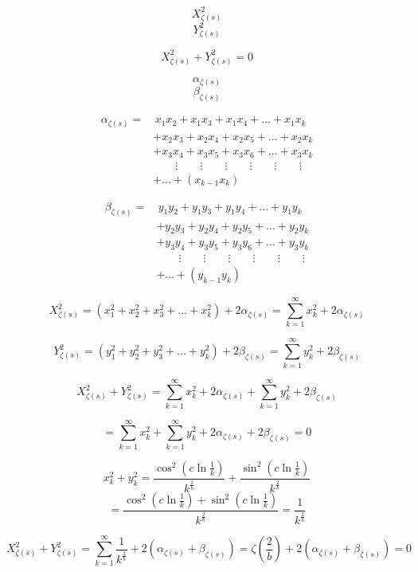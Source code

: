 \documentclass{amsart}
\begin{document}
	
	\[ X_{\zeta(s)}^2 \]
	\[ Y_{\zeta(s)}^2 \]
	
	\[ X_{\zeta(s)}^2 + Y_{\zeta(s)}^2 = 0 \]
	
	\[ \alpha_{\zeta(s)} \]
	\[ \beta_{\zeta(s)} \]
	
	\[
	\begin{aligned}
		\alpha_{\zeta(s)} =& \, x_1x_2 + x_1x_3 + x_1x_4 + \dots + x_{1}x_{k} \\
		& + x_2x_3 + x_2x_4 + x_2x_5 + \dots + x_2x_{k} \\
		& + x_3x_4 + x_3x_5 + x_3x_6 + \dots + x_3x_{k} \\
		& \qquad\vdots \qquad\vdots \qquad\vdots \qquad\vdots \qquad\vdots \qquad\vdots \\
		&  + \dots + (x_{k-1}x_{k})
	\end{aligned}
	\]
	
	\[
	\begin{aligned}
		\beta_{\zeta(s)} =& \, y_1y_2 + y_1y_3 + y_1y_4 + \dots + y_{1}y_{k} \\
		& + y_2y_3 + y_2y_4 + y_2y_5 + \dots + y_2y_{k} \\
		& + y_3y_4 + y_3y_5 + y_3y_6 + \dots + y_3y_{k} \\
		& \qquad\vdots \qquad\vdots \qquad\vdots \qquad\vdots \qquad\vdots \qquad\vdots \\
		&  + \dots + (y_{k-1}y_{k})
	\end{aligned}
	\]
	
	\[ X^2_{\zeta(s)} = (x_1^2 + x_2^2 + x_3^2 + \dots + x_k^2) + 2 \alpha_{\zeta(s)} = \sum\limits_{k=1}^{\infty}x_k^2 + 2 \alpha_{\zeta(s)} \]
	
	\[ Y^2_{\zeta(s)} = (y_1^2 + y_2^2 + y_3^2 + \dots + y_k^2) + 2 \beta_{\zeta(s)} = \sum\limits_{k=1}^{\infty}y_k^2 + 2 \beta_{\zeta(s)} \]
	
	\[ X^2_{\zeta(s)} + Y^2_{\zeta(s)} = \sum\limits_{k=1}^{\infty}x_k^2 + 2\alpha_{\zeta(s)} + \sum\limits_{k=1}^{\infty}y_k^2 + 2\beta_{\zeta(s)} \]
	
	\[ = \sum\limits_{k=1}^{\infty}x_k^2 + \sum\limits_{k=1}^{\infty}y_k^2 + 2\alpha_{\zeta(s)} +  2\beta_{\zeta(s)} = 0 \]
	
	\[ x_k^2 + y_k^2 = \frac{\cos^2(c \ln \frac{1}{k})}{k^{\frac{2}{b}}} + \frac{\sin^2(c \ln \frac{1}{k})}{k^{\frac{2}{b}}} \]
	\[ = \frac{\cos^2(c \ln \frac{1}{k}) + \sin^2(c \ln \frac{1}{k})}{k^{\frac{2}{b}}} = \frac{1}{k^{\frac{2}{b}}} \]
	
	\[ X^2_{\zeta(s)} + Y^2_{\zeta(s)} = \sum\limits_{k=1}^{\infty}\frac{1}{k^{\frac{2}{b}}} + 2(\alpha_{\zeta(s)} + \beta_{\zeta(s)}) = \zeta(\frac{2}{b}) + 2(\alpha_{\zeta(s)} + \beta_{\zeta(s)}) = 0 \]
	
\end{document}

